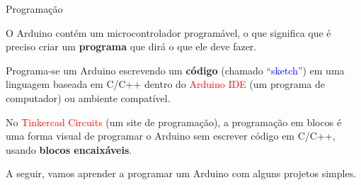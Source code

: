 \documentclass{beamer}
\begin{document}
\begin{frame}{Programação}
 
 
 O Arduino contém um microcontrolador programável, o que significa que é preciso criar um \textbf{programa} que dirá o que ele deve fazer.
 \vspace{0.5cm}
 
 Programa-se um Arduino escrevendo um \textbf{código} (chamado \textcolor{blue}{“sketch”}) em uma linguagem baseada em C/C++ dentro do \textcolor{red}{Arduino IDE} (um programa de computador) ou ambiente compatível.
 \vspace{0.5cm}
 
 No \textcolor{red}{Tinkercad Circuits} (um site de programação), a programação em blocos é uma forma visual de programar o Arduino sem escrever código em C/C++, usando \textbf{blocos encaixáveis}.
 \vspace{0.5cm}
 
 A seguir, vamos aprender a programar um Arduino com alguns projetos simples.
 
\end{frame}
\end{document}
